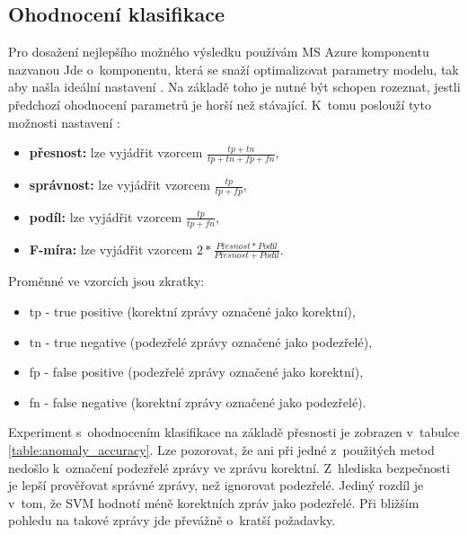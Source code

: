 \documentclass[thesis=M,czech]{FITthesis}[2012/10/20]
\begin{document}
		\subsection{Ohodnocení klasifikace}
			\label{subsec:classification_performance}
			Pro dosažení nejlepšího možného výsledku používám MS Azure komponentu nazvanou  Jde o~komponentu, která se snaží optimalizovat parametry modelu, tak aby našla ideální nastavení \cite{msAzure}. Na základě toho je nutné být schopen rozeznat, jestli předchozí ohodnocení parametrů je horší než stávající. K~tomu poslouží tyto možnosti nastavení \cite{powers-precision}:
			
			\begin{itemize} 
				\item \textbf{přesnost: }  lze vyjádřit vzorcem $\frac{tp+tn}{tp+tn+fp+fn}$,
				\item \textbf{správnost: } lze vyjádřit vzorcem $\frac{tp}{tp+fp}$,
				\item \textbf{podíl: } lze vyjádřit vzorcem $\frac{tp}{tp+fn}$,
				\item \textbf{F-míra: } lze vyjádřit vzorcem $2 * \frac{Přesnost*Podíl}{Přesnost + Podíl}$.				
			\end{itemize}
		
			Proměnné ve vzorcích jsou zkratky:
			\begin{itemize} 
				\item tp - true positive (korektní zprávy označené jako korektní),
				\item tn - true negative (podezřelé zprávy označené jako podezřelé),
				\item fp - false positive (podezřelé zprávy označené jako korektní),
				\item fn - false negative (korektní zprávy označené jako podezřelé).				
			\end{itemize}
		
			Experiment s~ohodnocením klasifikace na základě přesnosti je zobrazen v~tabulce \ref{table:anomaly_accuracy}. Lze pozorovat, že ani při jedné z~použitých metod nedošlo k~označení podezřelé zprávy ve zprávu korektní. Z~hlediska bezpečnosti je lepší prověřovat správné zprávy, než ignorovat podezřelé. Jediný rozdíl je v~tom, že SVM hodnotí méně korektních zpráv jako podezřelé. Při bližším pohledu na takové zprávy jde převážně o~kratší požadavky.
			
\end{document}
